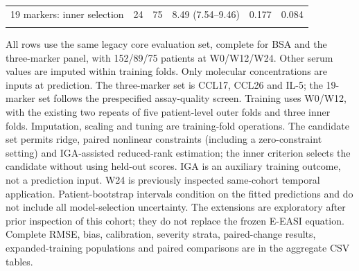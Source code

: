 {\begin{longtable}{p{46mm}rrrrr}
19 markers: inner selection & 24 & 75 & 8.49 (7.54--9.46) & 0.177 & 0.084 \\
\addlinespace
\bottomrule\end{longtable}
All rows use the same legacy core evaluation set, complete for BSA and the three-marker panel, with 152/89/75 patients at W0/W12/W24. Other serum values are imputed within training folds. Only molecular concentrations are inputs at prediction. The three-marker set is CCL17, CCL26 and IL-5; the 19-marker set follows the prespecified assay-quality screen. Training uses W0/W12, with the existing two repeats of five patient-level outer folds and three inner folds. Imputation, scaling and tuning are training-fold operations. The candidate set permits ridge, paired nonlinear constraints (including a zero-constraint setting) and IGA-assisted reduced-rank estimation; the inner criterion selects the candidate without using held-out scores. IGA is an auxiliary training outcome, not a prediction input. W24 is previously inspected same-cohort temporal application. Patient-bootstrap intervals condition on the fitted predictions and do not include all model-selection uncertainty. The extensions are exploratory after prior inspection of this cohort; they do not replace the frozen E-EASI equation. Complete RMSE, bias, calibration, severity strata, paired-change results, expanded-training populations and paired comparisons are in the aggregate CSV tables.
}

